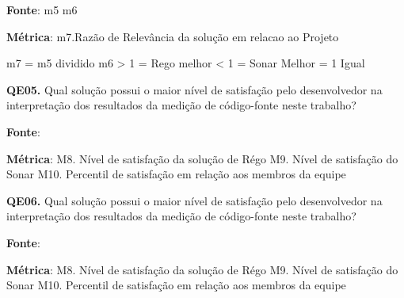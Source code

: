 \textbf{Fonte}: m5 m6

\textbf{Métrica}:  m7.Razão de Relevância da solução em relacao ao Projeto

m7 = m5 dividido  m6
> 1 = Rego melhor
		< 1 = Sonar Melhor
	= 1 Igual


\textbf{QE05.} Qual solução possui o maior nível de satisfação pelo desenvolvedor na interpretação dos resultados da medição de código-fonte neste trabalho?

\textbf{Fonte}:  

\textbf{Métrica}: 	M8. Nível de satisfação da solução de R{\'e}go
		M9. Nível de satisfação do Sonar
		M10. Percentil de satisfação em relação aos membros da equipe
		

\textbf{QE06.} Qual solução possui o maior nível de satisfação pelo desenvolvedor na interpretação dos resultados da medição de código-fonte neste trabalho?

\textbf{Fonte}:  

\textbf{Métrica}: 	M8. Nível de satisfação da solução de R{\'e}go
		M9. Nível de satisfação do Sonar
		M10. Percentil de satisfação em relação aos membros da equipe
		
	 	 


